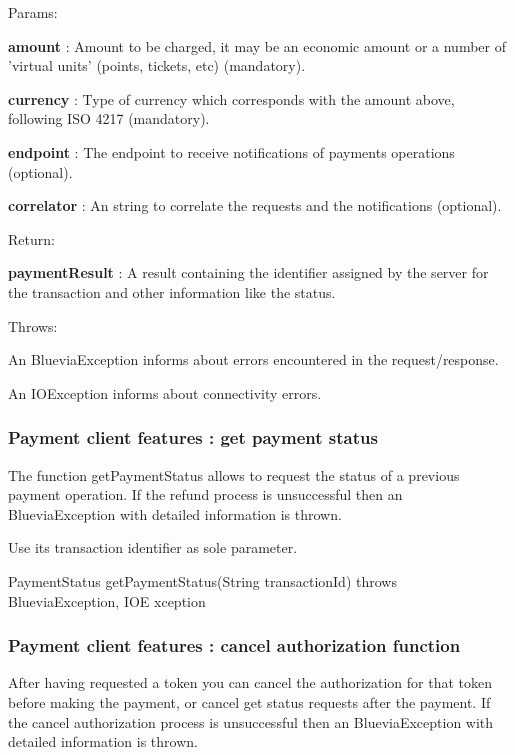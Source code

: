 Params:\par
 {\bfseries amount} : Amount to be charged, it may be an economic amount or a number of 'virtual units' (points, tickets, etc) (mandatory). \par
 {\bfseries currency} : Type of currency which corresponds with the amount above, following ISO 4217 (mandatory). \par
 {\bfseries endpoint} : The endpoint to receive notifications of payments operations (optional). \par
 {\bfseries correlator} : An string to correlate the requests and the notifications (optional). \par
 Return:\par
 {\bfseries paymentResult} : A result containing the identifier assigned by the server for the transaction and other information like the status.\par
 Throws:\par
 An BlueviaException informs about errors encountered in the request/response.\par
 An IOException informs about connectivity errors.\par
\hypertarget{blv_payment_guide_paymentclient_features_get_status_function}{}\subsubsection{Payment client features : get payment status}\label{blv_payment_guide_paymentclient_features_get_status_function}
The function getPaymentStatus allows to request the status of a previous payment operation. If the refund process is unsuccessful then an BlueviaException with detailed information is thrown.

Use its transaction identifier as sole parameter.


\begin{DoxyCode}
PaymentStatus getPaymentStatus(String transactionId) throws BlueviaException, IOE
      xception
\end{DoxyCode}
\hypertarget{blv_payment_guide_paymentclient_features_cancel_authorization_function}{}\subsubsection{Payment client features : cancel authorization function}\label{blv_payment_guide_paymentclient_features_cancel_authorization_function}
After having requested a token you can cancel the authorization for that token before making the payment, or cancel get status requests after the payment. If the cancel authorization process is unsuccessful then an BlueviaException with detailed information is thrown.


